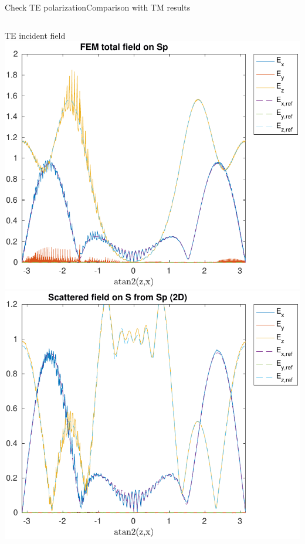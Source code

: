 \begin{frame}[allowframebreaks]{Check TE polarization}{Comparison
      with TM results}
\begin{columns}
      \hfill TE incident field \hfill\mbox{}
      \vspace{1ex}
      \includegraphics[width=\linewidth]{results/TE/E_Sp.pdf}
      \includegraphics[width=\linewidth]{results/TE/E_S.pdf}
      
    \end{columns}
    
    \framebreak
    

\end{frame}
